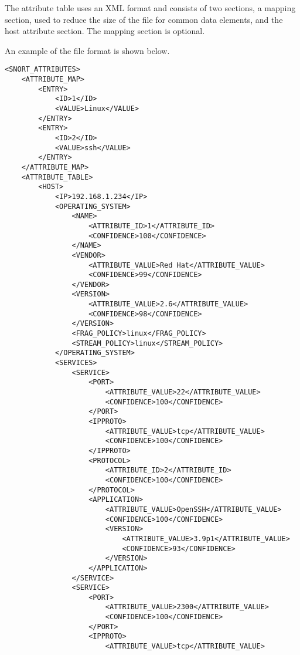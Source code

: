 \documentclass[english]{report}
\begin{document}
The attribute table uses an XML format and consists of two sections, a mapping
section, used to reduce the size of the file for common data elements, and the
host attribute section.  The mapping section is optional.

An example of the file format is shown below.

\begin{verbatim}
<SNORT_ATTRIBUTES>
    <ATTRIBUTE_MAP>
        <ENTRY>
            <ID>1</ID>
            <VALUE>Linux</VALUE>
        </ENTRY>
        <ENTRY>
            <ID>2</ID>
            <VALUE>ssh</VALUE>
        </ENTRY>
    </ATTRIBUTE_MAP>
    <ATTRIBUTE_TABLE>
        <HOST>
            <IP>192.168.1.234</IP>
            <OPERATING_SYSTEM>
                <NAME>
                    <ATTRIBUTE_ID>1</ATTRIBUTE_ID>
                    <CONFIDENCE>100</CONFIDENCE>
                </NAME>
                <VENDOR>
                    <ATTRIBUTE_VALUE>Red Hat</ATTRIBUTE_VALUE>
                    <CONFIDENCE>99</CONFIDENCE>
                </VENDOR>
                <VERSION>
                    <ATTRIBUTE_VALUE>2.6</ATTRIBUTE_VALUE>
                    <CONFIDENCE>98</CONFIDENCE>
                </VERSION>
                <FRAG_POLICY>linux</FRAG_POLICY>
                <STREAM_POLICY>linux</STREAM_POLICY>
            </OPERATING_SYSTEM>
            <SERVICES>
                <SERVICE>
                    <PORT>
                        <ATTRIBUTE_VALUE>22</ATTRIBUTE_VALUE>
                        <CONFIDENCE>100</CONFIDENCE>
                    </PORT>
                    <IPPROTO>
                        <ATTRIBUTE_VALUE>tcp</ATTRIBUTE_VALUE>
                        <CONFIDENCE>100</CONFIDENCE>
                    </IPPROTO>
                    <PROTOCOL>
                        <ATTRIBUTE_ID>2</ATTRIBUTE_ID>
                        <CONFIDENCE>100</CONFIDENCE>
                    </PROTOCOL>
                    <APPLICATION>
                        <ATTRIBUTE_VALUE>OpenSSH</ATTRIBUTE_VALUE>
                        <CONFIDENCE>100</CONFIDENCE>
                        <VERSION>
                            <ATTRIBUTE_VALUE>3.9p1</ATTRIBUTE_VALUE>
                            <CONFIDENCE>93</CONFIDENCE>
                        </VERSION>
                    </APPLICATION>
                </SERVICE>
                <SERVICE>
                    <PORT>
                        <ATTRIBUTE_VALUE>2300</ATTRIBUTE_VALUE>
                        <CONFIDENCE>100</CONFIDENCE>
                    </PORT>
                    <IPPROTO>
                        <ATTRIBUTE_VALUE>tcp</ATTRIBUTE_VALUE>

\end{verbatim}
\end{document}
